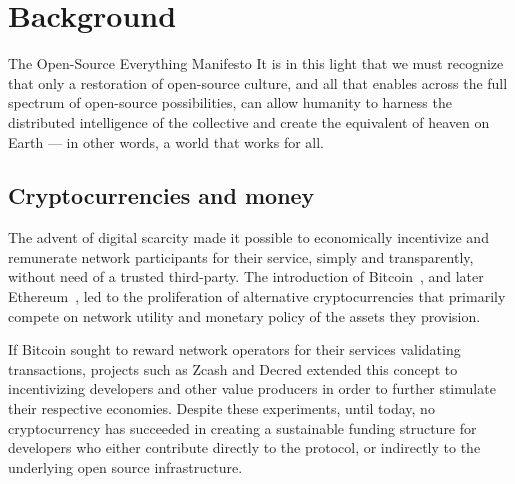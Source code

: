 \section{Background}

\begin{epigraph}{The Open-Source Everything Manifesto}
    \noindent It is in this light that we must recognize that only a restoration of
    open-source culture, and all that enables across the full spectrum of
    open-source possibilities, can allow humanity to harness the distributed
    intelligence of the collective and create the equivalent of heaven on Earth
    --- in other words, a world that works for all.
\end{epigraph}

\subsection{Cryptocurrencies and money}

The advent of digital scarcity made it possible to economically incentivize
and remunerate network participants for their service, simply and
transparently, without need of a trusted third-party. The introduction
of Bitcoin~\cite{bitcoin}, and later Ethereum~\cite{ethereum}, led to the
proliferation of alternative cryptocurrencies that primarily compete on network
utility and monetary policy of the assets they provision.


If Bitcoin sought to reward network operators for their services validating
transactions, projects such as Zcash and Decred extended this concept to
incentivizing developers and other value producers in order to further stimulate
their respective economies. Despite these experiments, until today, no cryptocurrency
has succeeded in creating a sustainable funding structure for developers who either
contribute directly to the protocol, or indirectly to the underlying open source
infrastructure.


